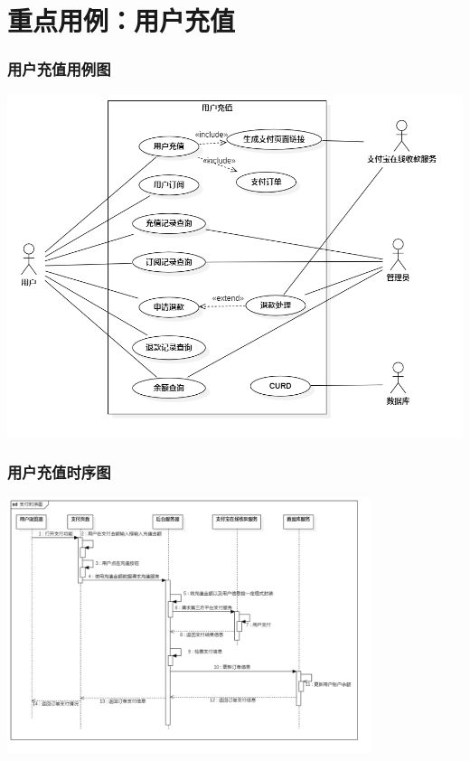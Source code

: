 \section{重点用例：用户充值}
\begin{frame}
    \frametitle{用户充值用例图}
    \center
    \includegraphics[scale=0.3]{contents/figure/recharge_usecase_diagram.png}
\end{frame}
\begin{frame}
    \frametitle{用户充值时序图}
    \center
    \includegraphics[width=4.2in]{contents/figure/recharge_sequence_diagram.png}
\end{frame}